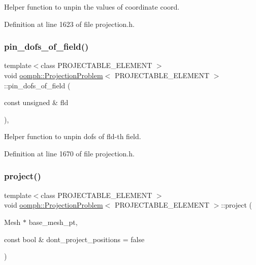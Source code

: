 Helper function to unpin the values of coordinate coord. 



Definition at line 1623 of file projection.\+h.

\mbox{\label{classoomph_1_1ProjectionProblem_acff96fd0e3dda445ba806e253988c547}} 
\subsubsection{\texorpdfstring{pin\+\_\+dofs\+\_\+of\+\_\+field()}{pin\_dofs\_of\_field()}}
{\footnotesize\ttfamily template$<$class P\+R\+O\+J\+E\+C\+T\+A\+B\+L\+E\+\_\+\+E\+L\+E\+M\+E\+NT $>$ \\
void \hyperlink{classoomph_1_1ProjectionProblem}{oomph\+::\+Projection\+Problem}$<$ P\+R\+O\+J\+E\+C\+T\+A\+B\+L\+E\+\_\+\+E\+L\+E\+M\+E\+NT $>$\+::pin\+\_\+dofs\+\_\+of\+\_\+field (\begin{DoxyParamCaption}\item[{const unsigned \&}]{fld }\end{DoxyParamCaption})\hspace{0.3cm}{\ttfamily [inline]}, {\ttfamily [private]}}



Helper function to unpin dofs of fld-\/th field. 



Definition at line 1670 of file projection.\+h.

\mbox{\label{classoomph_1_1ProjectionProblem_ad972f78212e515a03d1018996115265a}} 
\subsubsection{\texorpdfstring{project()}{project()}}
{\footnotesize\ttfamily template$<$class P\+R\+O\+J\+E\+C\+T\+A\+B\+L\+E\+\_\+\+E\+L\+E\+M\+E\+NT $>$ \\
void \hyperlink{classoomph_1_1ProjectionProblem}{oomph\+::\+Projection\+Problem}$<$ P\+R\+O\+J\+E\+C\+T\+A\+B\+L\+E\+\_\+\+E\+L\+E\+M\+E\+NT $>$\+::project (\begin{DoxyParamCaption}\item[{Mesh $\ast$}]{base\+\_\+mesh\+\_\+pt,  }\item[{const bool \&}]{dont\+\_\+project\+\_\+positions = {\ttfamily false} }\end{DoxyParamCaption})\hspace{0.3cm}{\ttfamily [inline]}}



